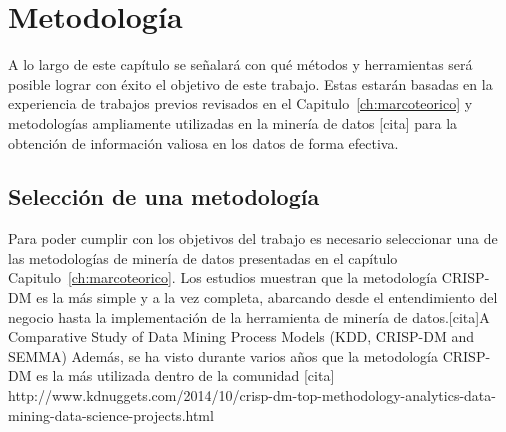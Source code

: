 \chapter{Metodología}
\label{ch:metodologia}

A lo largo de este capítulo se señalará con qué métodos y herramientas será posible lograr con éxito el objetivo de este trabajo. Estas estarán basadas en la experiencia de trabajos previos revisados en el Capitulo~\ref{ch:marcoteorico} y metodologías ampliamente utilizadas en la minería de datos [cita] para la obtención de información valiosa en los datos de forma efectiva.

\section{Selección de una metodología}

Para poder cumplir con los objetivos del trabajo es necesario seleccionar una de las metodologías de minería de datos presentadas en el capítulo Capitulo~\ref{ch:marcoteorico}. Los estudios muestran que la metodología CRISP-DM es la más simple y a la vez completa, abarcando desde el entendimiento del negocio hasta la implementación de la herramienta de minería de datos.[cita]A Comparative Study of Data Mining Process Models (KDD, CRISP-DM and SEMMA) Además, se ha visto durante varios años que la metodología CRISP-DM es la más utilizada dentro de la comunidad [cita] http://www.kdnuggets.com/2014/10/crisp-dm-top-methodology-analytics-data-mining-data-science-projects.html

